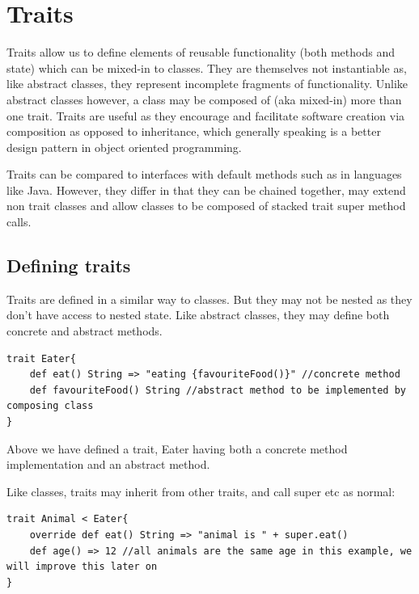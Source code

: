 \documentclass[conc-doc]{subfiles}
\begin{document}
	
	\chapter[Traits]{Traits}



Traits allow us to define elements of reusable functionality (both methods and state) which can be mixed-in to classes. They are themselves not instantiable as, like abstract classes, they represent incomplete fragments of functionality. Unlike abstract classes however, a class may be composed of (aka mixed-in) more than one trait. Traits are useful as they encourage and facilitate software creation via composition as opposed to inheritance, which generally speaking is a better design pattern in object oriented programming.

Traits can be compared to interfaces with default methods such as in languages like Java. However, they differ in that they can be chained together, may extend non trait classes and allow classes to be composed of stacked trait super method calls.

\section{Defining traits}
Traits are defined in a similar way to classes. But they may not be nested as they don't have access to nested state. Like abstract classes, they may define both concrete and abstract methods.
\begin{lstlisting}
trait Eater{
	def eat() String => "eating {favouriteFood()}" //concrete method
	def favouriteFood() String //abstract method to be implemented by composing class
}
\end{lstlisting}

Above we have defined a trait, Eater having both a concrete method implementation and an abstract method.

Like classes, traits may inherit from other traits, and call super etc as normal:
\begin{lstlisting}
trait Animal < Eater{
	override def eat() String => "animal is " + super.eat()
	def age() => 12 //all animals are the same age in this example, we will improve this later on
}
\end{lstlisting}
\end{document}

